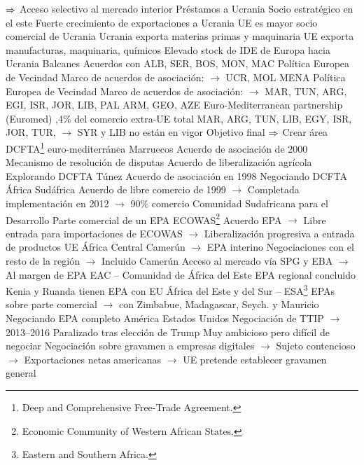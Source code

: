 \documentclass{nuevotema}
\begin{document}
\begin{esquemal}
				\4[] $\Rightarrow$ Acceso selectivo al mercado interior
				\4[] Préstamos a Ucrania
				\4[] Socio estratégico en el este
				\4[] Fuerte crecimiento de exportaciones a Ucrania
				\4[] UE es mayor socio comercial de Ucrania
				\4[] Ucrania exporta materias primas y maquinaria
				\4[] UE exporta manufacturas, maquinaria, químicos
				\4[] Elevado stock de IDE de Europa hacia Ucrania
				\4 Balcanes
				\4[] Acuerdos con ALB, SER, BOS, MON, MAC
				\4 Política Europea de Vecindad
				\4[] Marco de acuerdos de asociación:
				\4[] $\to$ UCR, MOL
			\3 MENA
				\4 Política Europea de Vecindad
				\4[] Marco de acuerdos de asociación:
				\4[] $\to$ MAR, TUN, ARG, EGI, ISR, JOR, LIB, PAL
				\4[] ARM, GEO, AZE
				\4 Euro-Mediterranean partnership (Euromed)
				,4\% del comercio extra-UE total
				\4[] MAR, ARG, TUN, LIB, EGY, ISR, JOR, TUR,
				\4[] $\to$ SYR y LIB no están en vigor
				\4[] Objetivo final
				\4[] $\Rightarrow$ Crear área DCFTA\footnote{Deep and Comprehensive Free-Trade Agreement.}
 euro-mediterránea
				\4 Marruecos
				\4[] Acuerdo de asociación de 2000
				\4[] Mecanismo de resolución de disputas
				\4[] Acuerdo de liberalización agrícola
				\4[] Explorando DCFTA
				\4 Túnez
				\4[] Acuerdo de asociación en 1998
				\4[] Negociando DCFTA
			\3 África
				\4 Sudáfrica
				\4[] Acuerdo de libre comercio de 1999
				\4[] $\to$ Completada implementación en 2012
				\4[] $\to$ 90\% comercio
				\4 Comunidad Sudafricana para el Desarrollo
				\4[] Parte comercial de un EPA
				\4 ECOWAS\footnote{Economic Community of Western African States.}
				\4[] Acuerdo EPA
				\4[] $\to$ Libre entrada para importaciones de ECOWAS
				\4[] $\to$ Liberalización progresiva a entrada de productos UE
				\4 África Central
				\4[] Camerún
				\4[] $\to$ EPA interino
				\4[] Negociaciones con el resto de la región
				\4[] $\to$ Incluido Camerún
				\4[] Acceso al mercado vía SPG y EBA
				\4[] $\to$ Al margen de EPA
				\4 EAC -- Comunidad de África del Este
				\4[] EPA regional concluido
				\4[] Kenia y Ruanda tienen EPA con EU
				\4 África del Este y del Sur -- ESA\footnote{Eastern and Southern Africa.}
				\4[] EPAs sobre parte comercial
				\4[] $\to$ con Zimbabue, Madagascar, Seych. y Mauricio
				\4[] Negociando EPA completo
			\3 América
				\4 Estados Unidos
				\4[] Negociación de TTIP
				\4[] $\to$ 2013--2016
				\4[] Paralizado tras elección de Trump
				\4[] Muy ambicioso pero difícil de negociar
				\4[] Negociación sobre gravamen a empresas digitales
				\4[] $\to$ Sujeto contencioso
				\4[] $\to$ Exportaciones netas americanas
				\4[] $\to$ UE pretende establecer gravamen general

\end{esquemal}
\end{document}
